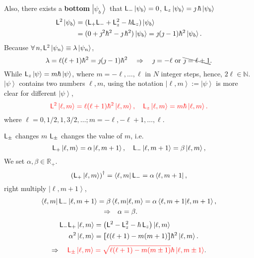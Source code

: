 \documentclass{article}
\newcommand{\ko}[1]{\hspace{-#1 pt}}%
\newcommand{\bra}[1]{\left\langle #1\right\vert}
\newcommand{\ket}[1]{\left\vert #1\right\rangle}
\newcommand{\brkt}[2]{\left\langle #1\middle\vert#2\right\rangle}
\newcommand{\kh}[1]{\left(#1\right)}
\newcommand{\cmm}[1]{\lfloor\ko{4.45}\lceil #1\rceil\ko{4.45}\rfloor}%
\newcommand{\spark}[1]{\textcolor{red}{#1}}
\begin{document}
Also, there exists a \textbf{bottom} $\ket{\psi_b}$ that $\sL_-\ket{\psi_b}=0$, $\sL_z\ket{\psi_b}=\jmath\,\hbar\ket{\psi_b}$
\begin{align*}
	\sL^2\ket{\psi_b} & =(\sL_+\sL_-+\sL_z^2-\hbar\sL_z)\ket{\psi_b}                                          \\
	                  & =(0+\jmath^2\hbar^2-\jmath\,\hbar^2)\ket{\psi_b}=\jmath(\jmath-1)\hbar^2\ket{\psi_b}.
\end{align*}
Because $\forall\,n,\sL^2\ket{\psi_n}\equiv\lambda\ket{\psi_n}$,
$$\lambda=\ell(\ell+1)\hbar^2=\jmath(\jmath-1)\hbar^2\quad\Rightarrow\quad\jmath=-\ell\text{~or~}\bcancel{\jmath=\ell+1}.$$
While $\sL_z\ket\psi=m\hbar\ket\psi$, where $m=-\ell,\ldots,\ell$ in $N$ integer steps, hence, $2\ell\in\mathbb N$. $\ket\psi$ contains two numbers $\ell,m$, using the notation $\ket{\ell,m}:=\ket\psi$ is more clear for different $\ket\psi$,
$$\spark{\sL^2\ket{\ell,m}=\ell(\ell+1)\hbar^2\ket{\ell,m},\quad\sL_z\ket{\ell,m}=m\hbar\ket{\ell,m}.}$$
where $\ell=0,1/2,1,3/2,\ldots;m=-\ell,-\ell+1,\ldots,\ell$.
\begin{example}{$\mathsf L_\pm$ changes $m$}{}
	$\mathsf L_\pm$ changes the value of $m$, i.e.
	$$\sL_+\ket{\ell,m}=\alpha\ket{\ell,m+1},\quad\sL_-\ket{\ell,m+1}=\beta\ket{\ell,m},$$
	We set $\alpha,\beta\in\mathbb R_+$.
	$$\kh{\sL_+\ket{\ell,m}}^\dagger=\bra{\ell,m}\sL_-=\alpha\bra{\ell,m+1},$$
	right multiply $\ket{\ell,m+1}$,
	\begin{align*}
		\bra{\ell,m}\sL_-\ket{\ell,m+1}=\beta & \brkt{\ell,m}{\ell,m}=\alpha\brkt{\ell,m+1}{\ell,m+1}, \\
		\Rightarrow                           & \quad\alpha=\beta.
	\end{align*}
	\begin{align*}
		\sL_-\sL_+\ket{\ell,m} & =\kh{\sL^2-\sL_z^2-\hbar\,\sL_z}\ket{\ell,m}   \\
		\alpha^2\ket{\ell,m}   & =\cmm{\ell(\ell+1)-m(m+1)}\hbar^2\ket{\ell,m}.
	\end{align*}
	$$\Rightarrow\quad\spark{\sL_\pm\ket{\ell,m}=\sqrt{\ell(\ell+1)-m(m\pm 1)}\hbar\ket{\ell,m\pm 1}}.$$
\end{example}
\end{document}
